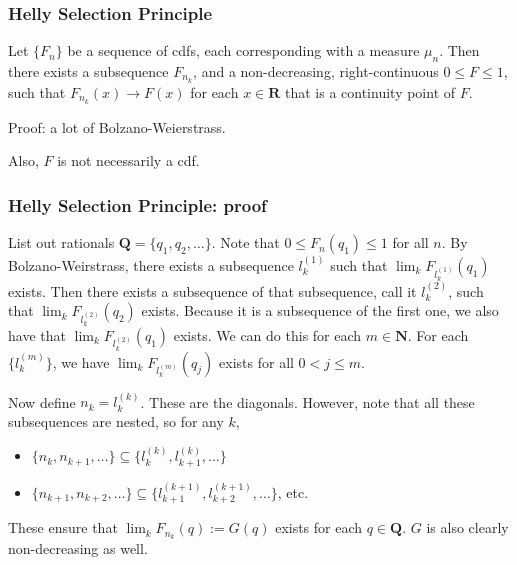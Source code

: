 \documentclass[handout]{beamer}
\begin{document}
%



\frame
{
\frametitle{Helly Selection Principle} 

\begin{Theorem} 
Let $\{F_n\}$ be a sequence of cdfs, each corresponding with a measure $\mu_n$. Then there exists a subsequence $F_{n_k}$, and a non-decreasing, right-continuous $0 \le F \le 1$, such that $F_{n_k}(x) \to F(x)$ for each $x \in \mathbf{R}$ that is a continuity point of $F$.
\end{Theorem}

Proof: a lot of Bolzano-Weierstrass.
\newline

Also, $F$ is not necessarily a cdf.
}

\frame
{
\frametitle{Helly Selection Principle: proof} 

List out rationals $\mathbf{Q} = \{q_1, q_2,\ldots\}$. Note that $0 \le F_n(q_1) \le 1$ for all $n$. By Bolzano-Weirstrass, there exists a subsequence $l_k^{(1)}$ such that $\lim_k F_{l_k^{(1)} }(q_1)$ exists. Then there exists a subsequence of that subsequence, call it $l_k^{(2)}$, such that $\lim_k F_{l_k^{(2)} }(q_2)$ exists. Because it is a subsequence of the first one, we also have that $\lim_k F_{l_k^{(2)} }(q_1)$ exists. We can do this for each $m \in \mathbf{N}$. For each $\{l_{k}^{(m)} \}$, we have $\lim_k F_{l_k^{(m)} }(q_j)$ exists for all $0 < j \le m$.
\newline

Now define $n_k = l_k^{(k)}$. These are the diagonals. However, note that all these subsequences are nested, so for any $k$, 
\begin{itemize}
\item $\{n_k, n_{k+1}, \ldots\} \subseteq \{l^{(k)}_{k}, l^{(k)}_{k+1},\ldots\}  $ 
\item $\{n_{k+1}, n_{k+2}, \ldots\} \subseteq \{l^{(k+1)}_{k+1}, l^{(k+1)}_{k+2},\ldots\}  $, etc. 
\end{itemize}

These ensure that $\lim_k F_{n_k}(q) := G(q)$ exists for each $q \in \mathbf{Q}$. $G$ is also clearly non-decreasing as well.

}
\end{document}
